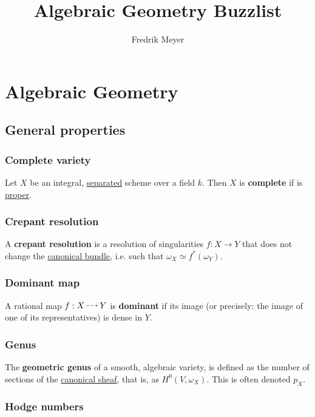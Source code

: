 \documentclass[11pt, english]{article}
\title{Algebraic Geometry Buzzlist}
\author{Fredrik Meyer}
\date{}
\begin{document}
\maketitle

\section{Algebraic Geometry}
\subsection{General properties}
\subsubsection{Complete variety}
\label{completevariety}
Let $X$ be an  integral, \hyperref[separated]{separated} scheme over a field $k$. Then $X$ is  \textbf{complete} if is \hyperref[proper]{proper}.

\subsubsection{Crepant resolution}
\label{crepantresolution}
A \textbf{crepant resolution} is a resolution of singularities $f:X \to Y$ that does not change the \hyperref[canonicalsheaf]{canonical bundle}, i.e. such that $\omega_X \simeq f^\ast (\omega_Y)$.

\subsubsection{Dominant map}
\label{dominantmap}

A rational map $f:X \rmap Y$ is  \textbf{dominant} if its image (or precisely: the image of one of its representatives) is dense in $Y$. 

\subsubsection{Genus}
\label{genus}
 
The \textbf{geometric genus} of a smooth, algebraic variety, is defined as the number of sections of the \hyperref[canonicalsheaf]{canonical sheaf}, that is, as $H^0(V,\omega_X)$. This is often denoted $p_X$.

\subsubsection{Hodge numbers}
\label{hodgenumbers}
\end{document}
